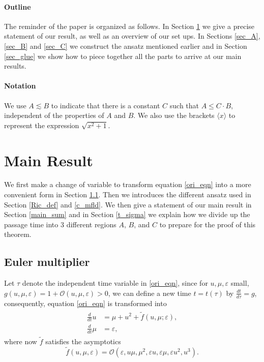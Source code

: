 \documentclass[letterpaper,11pt]{article}
\newcommand{\rmO}{\mathcal{O}}
\newcommand{\eps}{\varepsilon}
\newcommand{\lar}{ \lesssim }
\numberwithin{equation}{section}
\theoremstyle{plain}
\begin{document}
\paragraph{Outline}
The reminder of the paper is organized as follows. In Section \ref{sec_main} we give a precise statement of our result, as well as an overview of our set ups. In Sections \ref{sec_A}, \ref{sec_B} and \ref{sec_C} we construct the ansatz mentioned earlier and in Section \ref{sec_glue} we show how to piece together all the parts to arrive at our main results.


\paragraph{Notation}
We use $A \lar B$ to indicate that there is a constant $C$ such that $A \le C \cdot B$, independent of the properties of $A$ and $B$. We also use the brackets $\langle x \rangle$ to represent the expression $\sqrt{x^2+1}$.



\section{Main Result}\label{sec_main}
We first make a change of variable to transform equation \eqref{ori_eqn} into a more convenient form in Section \ref{euler_m}. Then we introduces the different ansatz used in Section \ref{Ric_def} and \ref{c_mfld}. We then give a statement of our main result in Section \ref{main_sum} and in Section \ref{t_sigma} we explain how we divide up the passage time into 3 different regions $A$, $B$, and $C$ to prepare for the proof of this theorem.

\subsection{Euler multiplier}\label{euler_m}
Let $\tau$ denote the independent time variable in \eqref{ori_eqn}, since for $u,\mu,\eps$ small, $g(u,\mu,\eps) = 1 + \rmO(u,\mu,\eps)>0$, we can define a new time $t = t(\tau)$ by $\frac{dt}{d\tau} = g$, consequently, equation \eqref{ori_eqn}  is transformed into
\begin{align}\label{euler_ori_eqn}
\begin{split}
\frac{d}{dt}u &= \mu+u^2+ \tilde{f}(u,\mu;\eps),\\
\frac{d}{dt}\mu &=  \eps ,
\end{split}
\end{align}
where now $\tilde{f}$ satisfies the asymptotics
\begin{equation}\label{nonlinear_asy_new}
\tilde{f}(u,\mu,\eps) = \rmO(\eps,  u\mu, \mu^2,\eps u, \eps \mu, \eps u^2, u^3).
\end{equation}  
\end{document}
